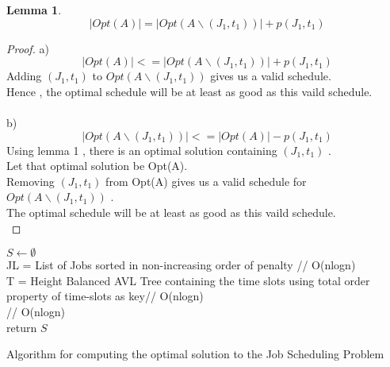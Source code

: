 \documentclass[11pt]{article}
\newtheorem{lemma}[theorem]{Lemma}
\begin{document}
\begin{lemma}
\[ 
\ \vert Opt(A) \vert = \vert Opt(A\backslash(J_1,t_1)) \vert + p(J_1,t_1) 
\]
\end{lemma}
\begin{proof}
a) \\
\[ 
\ \vert Opt(A) \vert <= \vert Opt(A\backslash(J_1,t_1)) \vert + p(J_1,t_1) 
\]
Adding $(J_1,t_1)$ to $Opt(A\backslash(J_1,t_1))$ gives us a valid schedule.\\
Hence , the optimal schedule will be at least as good as this vaild schedule. \\\\
b) \\
\[ 
\ \vert Opt(A\backslash(J_1,t_1)) \vert <= \vert Opt(A) \vert - p(J_1,t_1) 
\]
Using lemma 1 , there is an optimal solution containing $(J_1,t_1)$ .\\
Let that optimal solution be Opt(A). \\
Removing $(J_1,t_1)$ from Opt(A) gives us a valid schedule for $Opt(A\backslash(J_1,t_1))$ . \\
The optimal schedule will be at least as good as this vaild schedule. \\
\end{proof}

\begin{algorithm}[h]
$S\leftarrow \emptyset$\\
JL = List of Jobs sorted in non-increasing order of penalty // O(nlogn) \\
T = Height Balanced AVL Tree containing the time slots  using total order property of time-slots as key// O(nlogn) \\
 // O(nlogn) \\
return $S$
\caption{Algorithm for computing the optimal solution to the Job Scheduling Problem}
\label{skeleton}
\end{algorithm}

\pagebreak
\end{document}
